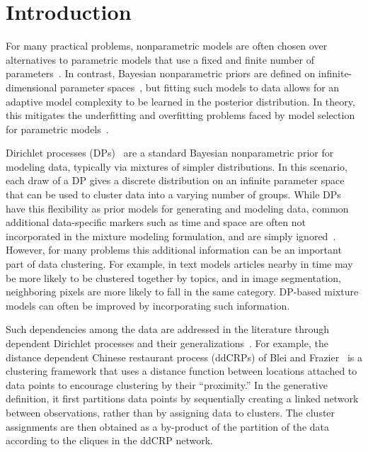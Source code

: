 \documentclass[runningheads,a4paper]{iscide}
\begin{document}
\section{Introduction}

For many practical problems, nonparametric models are often chosen over
alternatives to parametric models that use a fixed and finite number
of parameters~\cite{BNP:2010}.
 In contrast, Bayesian
nonparametric priors are defined on
infinite-dimensional parameter spaces~\cite{Orbanz10BNM}, but fitting such models to data allows for an adaptive model complexity to be learned in the posterior distribution. In theory, this mitigates the underfitting and
overfitting problems faced by model selection for parametric models~\cite{Teh10DP}.

Dirichlet processes (DPs)~\cite{Ferguson73DP} are a standard Bayesian nonparametric prior for modeling data, typically via mixtures of simpler distributions. In this scenario, each draw
of a DP gives a discrete distribution on an infinite parameter space that can be used to cluster data into a varying number of groups.
While DPs have this flexibility as prior models for generating and modeling data, common additional data-specific markers such as time and space are often not incorporated in the mixture modeling formulation, and are simply ignored~\cite{Sun16UT,Zhu16BID}. However, for many problems this additional information can be an important part of data clustering. For example, in text models articles nearby
in time may be more likely to be clustered together by topics, and in image
segmentation, neighboring pixels are more likely to fall in the same category.
DP-based mixture models can often be improved by incorporating such information.

Such dependencies among the data are addressed in the literature through dependent
Dirichlet processes and their
generalizations~\cite{MacE99DNP,Griffin06Ob,Duan07Biom,Sudderth08SS,Griffin11OU}.
For example, the distance dependent Chinese restaurant process (ddCRPs) of Blei and Frazier~\cite{Blei11ddcrp} is a
clustering framework that uses a distance function between locations attached to data points to encourage clustering by their ``proximity.'' In the generative definition, it first
partitions data points by sequentially creating a linked network between observations, rather than by assigning data to clusters. The cluster assignments are then obtained as a by-product of the partition of the data according to the cliques in the ddCRP network.
\end{document}
